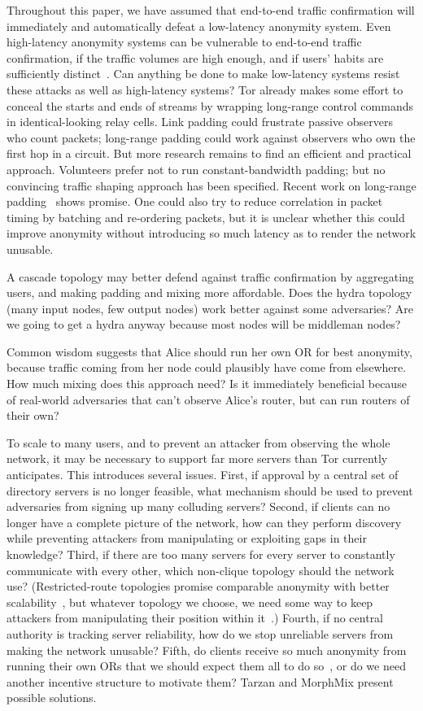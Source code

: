 \documentclass[twocolumn]{article}
\begin{document}
Throughout this paper, we have assumed that end-to-end traffic
confirmation will immediately and automatically defeat a low-latency
anonymity system. Even high-latency anonymity systems can be
vulnerable to end-to-end traffic confirmation, if the traffic volumes
are high enough, and if users' habits are sufficiently
distinct~\cite{statistical-disclosure,limits-open}. Can anything be
done to
make low-latency systems resist these attacks as well as high-latency
systems? Tor already makes some effort to conceal the starts and ends of
streams by wrapping long-range control commands in identical-looking
relay cells. Link padding could frustrate passive observers who count
packets; long-range padding could work against observers who own the
first hop in a circuit. But more research remains to find an efficient
and practical approach. Volunteers prefer not to run constant-bandwidth
padding; but no convincing traffic shaping approach has been
specified. Recent work on long-range padding~\cite{defensive-dropping}
shows promise. One could also try to reduce correlation in packet timing
by batching and re-ordering packets, but it is unclear whether this could
improve anonymity without introducing so much latency as to render the
network unusable.

A cascade topology may better defend against traffic confirmation by
aggregating users, and making padding and
mixing more affordable.  Does the hydra topology (many input nodes,
few output nodes) work better against some adversaries? Are we going
to get a hydra anyway because most nodes will be middleman nodes?

Common wisdom suggests that Alice should run her own OR for best
anonymity, because traffic coming from her node could plausibly have
come from elsewhere. How much mixing does this approach need?  Is it
immediately beneficial because of real-world adversaries that can't
observe Alice's router, but can run routers of their own?

To scale to many users, and to prevent an attacker from observing the
whole network, it may be necessary
to support far more servers than Tor currently anticipates.
This introduces several issues.  First, if approval by a central set
of directory servers is no longer feasible, what mechanism should be used
to prevent adversaries from signing up many colluding servers? Second,
if clients can no longer have a complete picture of the network,
how can they perform discovery while preventing attackers from
manipulating or exploiting gaps in their knowledge?  Third, if there
are too many servers for every server to constantly communicate with
every other, which non-clique topology should the network use?
(Restricted-route topologies promise comparable anonymity with better
scalability~\cite{danezis-pets03}, but whatever topology we choose, we
need some way to keep attackers from manipulating their position within
it~\cite{casc-rep}.) Fourth, if no central authority is tracking
server reliability, how do we stop unreliable servers from making
the network unusable?  Fifth, do clients receive so much anonymity
from running their own ORs that we should expect them all to do
so~\cite{econymics}, or do we need another incentive structure to
motivate them?  Tarzan and MorphMix present possible solutions.
\end{document}
